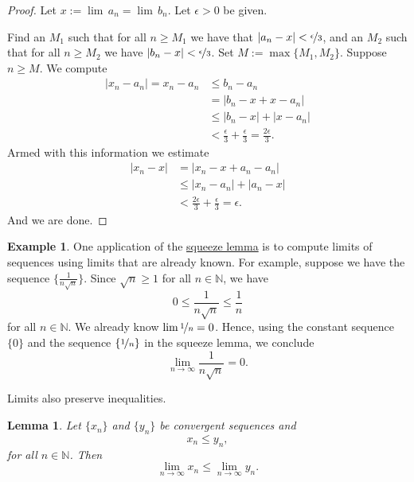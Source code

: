 \documentclass[12pt]{book}
\newcommand{\abs}[1]{\left\lvert {#1} \right\rvert}
\newcommand{\N}{{\mathbb{N}}}
\theoremstyle{plain}
\newtheorem{lemma}[thm]{Lemma}
\theoremstyle{remark}
\theoremstyle{definition}
\theoremstyle{exercise}
\theoremstyle{example}
\newtheorem{example}[thm]{Example}
\begin{document}
\begin{proof}
Let $x := \lim\, a_n = \lim\, b_n$.
Let $\epsilon > 0$ be given.

Find an $M_1$ such that for all $n \geq M_1$ we have
that $\abs{a_n-x} < \nicefrac{\epsilon}{3}$, and an $M_2$
such that for all $n \geq M_2$
we have $\abs{b_n-x} < \nicefrac{\epsilon}{3}$.  Set $M := \max \{M_1, M_2 \}$.
Suppose $n \geq M$.  We compute
\begin{equation*}
\begin{split}
\abs{x_n - a_n} = x_n-a_n & \leq b_n-a_n \\
& = \abs{b_n - x + x - a_n} \\
& \leq \abs{b_n - x} + \abs{x - a_n} \\
& < \frac{\epsilon}{3} + \frac{\epsilon}{3} = \frac{2\epsilon}{3} .
\end{split}
\end{equation*}
Armed with this information we estimate
\begin{equation*}
\begin{split}
\abs{x_n - x}
&= \abs{x_n - x + a_n - a_n}
\\
&\leq \abs{x_n - a_n} + \abs{a_n - x}
\\
& < \frac{2\epsilon}{3} +  \frac{\epsilon}{3} = \epsilon .
\end{split}
\end{equation*}
And we are done.
\end{proof}

\begin{example}
One application of
the \hyperref[squeeze:lemma]{squeeze lemma} is to compute limits of 
sequences using limits that are already known.  For example, suppose 
we have the sequence $\{ \frac{1}{n\sqrt{n}} \}$.
Since $\sqrt{n} \geq 1$ for all $n \in \N$, we have
\begin{equation*}
0 \leq \frac{1}{n\sqrt{n}} \leq \frac{1}{n}
\end{equation*}
for all $n \in \N$.  We already know $\lim \nicefrac{1}{n} = 0$. 
Hence, using
the constant sequence $\{ 0 \}$ and the sequence $\{ \nicefrac{1}{n} \}$ in the
squeeze lemma, we conclude
\begin{equation*}
\lim_{n\to\infty} \frac{1}{n\sqrt{n}} = 0 .
\end{equation*}
\end{example}

Limits also preserve inequalities.

\begin{lemma} \label{limandineq:lemma}
Let $\{ x_n \}$ and $\{ y_n \}$ be
convergent sequences and
\begin{equation*}
x_n \leq y_n ,
\end{equation*}
for all $n \in \N$.  Then
\begin{equation*}
\lim_{n\to\infty} x_n \leq
\lim_{n\to\infty} y_n .
\end{equation*}
\end{lemma}
\end{document}
